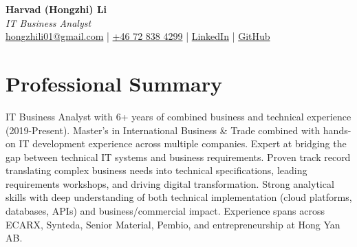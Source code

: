 \documentclass[11pt,a4paper]{article}
\begin{document}
\begin{center}
{\LARGE \textbf{Harvad (Hongzhi) Li}}\\[10pt]
{\Large \textit{IT Business Analyst}}\\[10pt]
\textcolor{titlecolor}{\href{mailto:hongzhili01@gmail.com}{hongzhili01@gmail.com} | \href{tel:+46728384299}{+46 72 838 4299} | \href{https://www.linkedin.com/in/harvad/}{LinkedIn} | \href{https://github.com/bluehawana}{GitHub}}
\end{center}

\vspace{8pt}

\section*{Professional Summary}
IT Business Analyst with 6+ years of combined business and technical experience (2019-Present). Master's in International Business & Trade combined with hands-on IT development experience across multiple companies. Expert at bridging the gap between technical IT systems and business requirements. Proven track record translating complex business needs into technical specifications, leading requirements workshops, and driving digital transformation. Strong analytical skills with deep understanding of both technical implementation (cloud platforms, databases, APIs) and business/commercial impact. Experience spans across ECARX, Synteda, Senior Material, Pembio, and entrepreneurship at Hong Yan AB.
\end{document}
